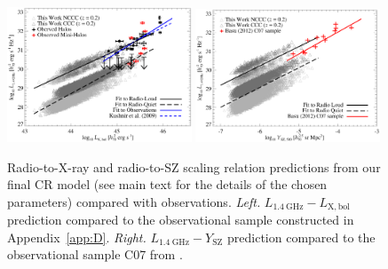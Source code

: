 \documentclass[traditabstract]{aa}
\newcommand{\rmn}{\mathrm}
\begin{document}
\begin{figure}[t]
\centering
\includegraphics[width=0.49\textwidth]{figures/PL_relation.eps}
\includegraphics[width=0.49\textwidth]{figures/PSZ_relation.eps}
\caption{Radio-to-X-ray and radio-to-SZ scaling relation predictions from our final CR model (see main text for the details of the chosen parameters) compared with observations.
\emph{Left.} $L_{1.4~\rmn{GHz}}-L_{\rmn{X,bol}}$ prediction compared to the observational sample constructed in Appendix~\ref{app:D}. \emph{Right.} $L_{1.4~\rmn{GHz}}-Y_{\rmn{SZ}}$ prediction compared to the observational sample C07 from \cite{2012MNRAS.421L.112B}.}
\label{fig:PLSZ}
\end{figure} 
 
\end{document}
